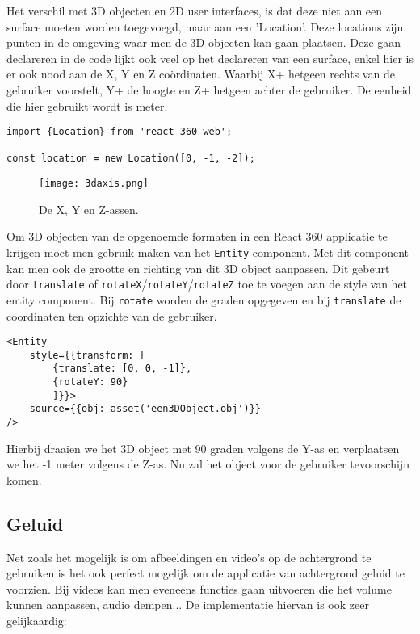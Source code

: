 Het verschil met 3D objecten en 2D user interfaces, is dat deze niet aan een surface moeten worden toegevoegd, maar aan een 'Location'. Deze locations zijn  punten in de omgeving waar men de 3D objecten kan gaan plaatsen. Deze gaan declareren in de code lijkt ook veel op het declareren van een surface, enkel hier is er ook nood aan de X, Y en Z coördinaten. Waarbij X+ hetgeen rechts van de gebruiker voorstelt, Y+ de hoogte en Z+ hetgeen achter de gebruiker. De eenheid die hier gebruikt wordt is meter.

\begin{lstlisting}[frame=single, caption=Voorbeeld van een location]
import {Location} from 'react-360-web';

const location = new Location([0, -1, -2]);
\end{lstlisting}

\begin{figure}[H]
	\centering
	\texttt{[image: 3daxis.png]}
	\caption{De X, Y en Z-assen.}
	\label{fig:xyz-axis}
\end{figure}

Om 3D objecten van de opgenoemde formaten in een React 360 applicatie te krijgen moet men gebruik maken van het \lstinline[basicstyle=\ttfamily\color{red}]|Entity| component. Met dit component kan men ook de grootte en richting van dit 3D object aanpassen. Dit gebeurt door \lstinline[basicstyle=\ttfamily\color{red}]|translate| of \lstinline[basicstyle=\ttfamily\color{red}]|rotateX|/\lstinline[basicstyle=\ttfamily\color{red}]|rotateY|/\lstinline[basicstyle=\ttfamily\color{red}]|rotateZ| toe te voegen aan de style van het entity component. Bij \lstinline[basicstyle=\ttfamily\color{red}]|rotate| worden de graden opgegeven en bij \lstinline[basicstyle=\ttfamily\color{red}]|translate| de coordinaten ten opzichte van de gebruiker.

\begin{lstlisting}[frame=single, caption=Voorbeeld van een Entity component]
<Entity 
	style={{transform: [
		{translate: [0, 0, -1]},
		{rotateY: 90}
		]}}>
	source={{obj: asset('een3DObject.obj')}}
/>
\end{lstlisting}

Hierbij draaien we het 3D object met 90 graden volgens de Y-as en verplaatsen we het -1 meter volgens de Z-as. Nu zal het object voor de gebruiker tevoorschijn komen.

\subsection{Geluid}
\label{subsec:Geluid}
Net zoals het mogelijk is om afbeeldingen en video's op de achtergrond te gebruiken is het ook perfect mogelijk om de applicatie van achtergrond geluid te voorzien. Bij videos kan men eveneens functies gaan uitvoeren die het volume kunnen aanpassen, audio dempen... De implementatie hiervan is ook zeer gelijkaardig:

